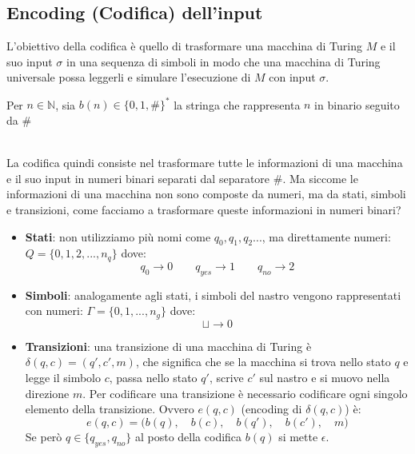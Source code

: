 \subsection{Encoding (Codifica) dell'input} \label{cod}
L'obiettivo della codifica è quello di trasformare una macchina di Turing $M$ e il suo input $\sigma$ in una sequenza di simboli in modo che una macchina di Turing universale 
possa leggerli e simulare l'esecuzione di $M$ con input $\sigma$.\smallskip\\
\colorbox{SALZO}{\parbox{\dimexpr\linewidth-2\fboxsep}{\begin{definition}
   Per $n \in \mathbb{N}$, sia $b(n) \in \{0,1,\#\}^*$ la stringa che rappresenta $n$ in binario seguito da $\#$
\end{definition}}}\smallskip\\
La codifica quindi consiste nel trasformare tutte le informazioni di una macchina e il suo input in numeri binari separati dal separatore $\#$. Ma siccome le informazioni di una macchina non sono composte da numeri, ma da stati, simboli
e transizioni, come facciamo a trasformare queste informazioni in numeri binari?
\begin{itemize}
    \item \textbf{Stati}: non utilizziamo più nomi come $q_0,q_1,q_2...$, ma direttamente numeri: $Q = \{ 0,1,2,...,n_q \}$ dove:
    \[     q_0 \to 0 \qquad q_{yes} \to 1 \qquad q_{no} \to 2      \]
    \item \textbf{Simboli}: analogamente agli stati, i simboli del nastro vengono rappresentati con numeri: $\Gamma = \{ 0,1, ...,n_{g}  \}$ dove:
    \[  \sqcup \to 0   \]
    \item \textbf{Transizioni}: una transizione di una macchina di Turing è $\delta (q,c) = (q',c',m)$, che significa che se la macchina si trova nello stato $q$ e legge il simbolo $c$, passa nello stato $q'$, scrive $c'$ sul nastro e si muovo nella direzione $m$.
    Per codificare una transizione è necessario codificare ogni singolo elemento della transizione. Ovvero $e(q,c)$ (encoding di $\delta (q,c)$) è:
    \[  e(q,c) = \Big(    b(q),\quad b(c), \quad b(q'), \quad b(c'),\quad m       \Big)     \]
    Se però $q \in \{  q_{yes}, q_{no}\}$ al posto della codifica $b(q)$ si mette $\epsilon$.
\end{itemize}

